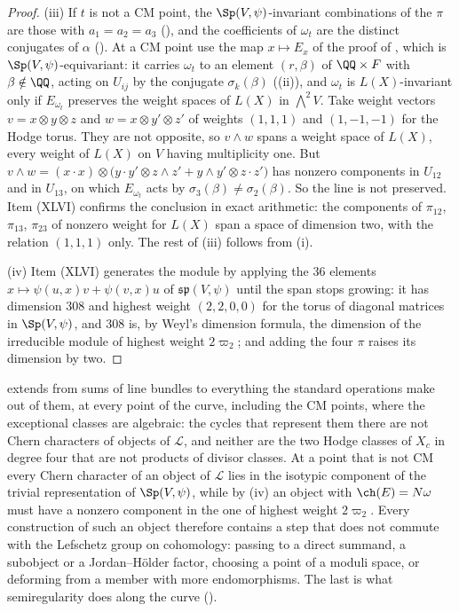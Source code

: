 \begin{proof}
(iii) If $t$ is not a CM point, the $\Sp(V,\psi)$-invariant combinations of the
$\pi$ are those with $a_{1}=a_{2}=a_{3}$ (), and
the coefficients of $\omega_{t}$ are the distinct conjugates of $\alpha$
(). At a CM point use the map $x\mapsto E_{x}$ of the
proof of , which is $\Sp(V,\psi)$-equivariant: it
carries $\omega_{t}$ to an element $(r,\beta)$ of $\QQ\times F$ with
$\beta\notin\QQ$, acting on $U_{ij}$ by the conjugate $\sigma_{k}(\beta)$
((ii)), and $\omega_{t}$ is $L(X)$-invariant only if
$E_{\omega_{t}}$ preserves the weight spaces of $L(X)$ in ${\textstyle\bigwedge^{2}}V$. Take
weight vectors $v=x\otimes y\otimes z$ and $w=x\otimes y'\otimes z'$ of
weights $(1,1,1)$ and $(1,-1,-1)$ for the Hodge torus. They are not
opposite, so $v\wedge w$ spans a weight space of $L(X)$, every weight of
$L(X)$ on $V$ having multiplicity one. But
$v\wedge w=(x\cdot x)\otimes\bigl(y\cdot y'\otimes z\wedge z'+y\wedge y'
\otimes z\cdot z'\bigr)$ has nonzero components in $U_{12}$ and in $U_{13}$,
on which $E_{\omega_{t}}$ acts by $\sigma_{3}(\beta)\ne\sigma_{2}(\beta)$. So
the line is not preserved. Item (XLVI) confirms the conclusion in exact
arithmetic: the components of $\pi_{12}$, $\pi_{13}$, $\pi_{23}$ of nonzero
weight for $L(X)$ span a space of dimension two, with the relation
$(1,1,1)$ only. The rest of (iii) follows from (i).

(iv) Item (XLVI) generates the module by applying the $36$ elements
$x\mapsto\psi(u,x)v+\psi(v,x)u$ of $\mathfrak{sp}(V,\psi)$ until the span
stops growing: it has dimension $308$ and highest weight $(2,2,0,0)$ for the
torus of diagonal matrices in $\Sp(V,\psi)$, and $308$ is, by Weyl's
dimension formula, the dimension of
the irreducible module of highest weight $2\varpi_{2}$; and adding the four
$\pi$ raises its dimension by two.
\end{proof}

\begin{remark}
\label{rem:leavel}
 extends  from sums of
line bundles to everything the standard operations make out of them, at every
point of the curve, including the CM points, where the exceptional classes
are algebraic: the cycles that represent them there are not Chern characters
of objects of $\mathcal{L}$, and neither are the two Hodge classes of $X_{c}$
in degree four that are not products of divisor classes. At a point that is
not CM every Chern character of an object of $\mathcal{L}$ lies in the
isotypic component of the trivial representation of $\Sp(V,\psi)$, while by
(iv) an object with $\ch(E)=N\omega$ must have a nonzero component in the one
of highest weight $2\varpi_{2}$. Every construction of such an object
therefore contains a step that does not commute with the Lefschetz group on
cohomology: passing to a direct summand, a subobject or a Jordan--H\"older
factor, choosing a point of a moduli space, or deforming from a member with
more endomorphisms. The last is what semiregularity does along the curve
().
\end{remark}

